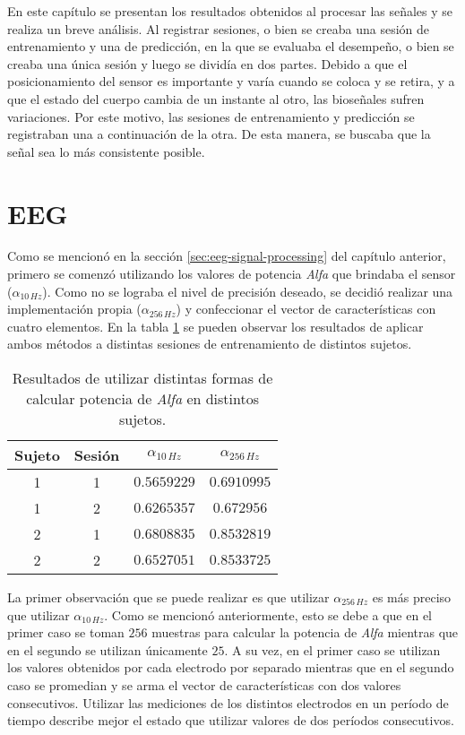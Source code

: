 En este capítulo se presentan los resultados obtenidos al procesar las señales y se realiza un breve análisis. Al registrar sesiones, o bien se creaba una sesión de entrenamiento y una de predicción, en la que se evaluaba el desempeño, o bien se creaba una única sesión y luego se dividía en dos partes. Debido a que el posicionamiento del sensor es importante y varía cuando se coloca y se retira,  y a que el estado del cuerpo cambia de un instante al otro, las bioseñales sufren variaciones. Por este motivo, las sesiones de entrenamiento y predicción se registraban una a continuación de la otra. De esta manera, se buscaba que la señal sea lo más consistente posible.

\section{EEG}

Como se mencionó en la sección \ref{sec:eeg-signal-processing} del capítulo anterior, primero se comenzó utilizando los valores de potencia \emph{Alfa} que brindaba el sensor ($\alpha_{10 \, Hz}$). Como no se lograba el nivel de precisión deseado, se decidió realizar una implementación propia ($\alpha_{256 \, Hz}$) y confeccionar el vector de características con cuatro elementos. En la tabla \ref{tab:eeg-results} se pueden observar los resultados de aplicar ambos métodos a distintas sesiones de entrenamiento de distintos sujetos.

\begin{table}[H]
\centering
\begin{tabular}{ |c|c|c|c| } 
 \hline
 Sujeto & Sesión & $\alpha_{10 \, Hz}$ &  $\alpha_{256 \, Hz}$ \\ 
 \hline
 1 & 1 & $0.5659229$ & $0.6910995$ \\
 \hline
 1 & 2 & $0.6265357$ & $0.672956$ \\
  \hline
 2 & 1 & $0.6808835$ & $0.8532819$ \\
  \hline
 2 & 2 & $0.6527051$ & $0.8533725$ \\

 \hline
\end{tabular}
\caption{Resultados de utilizar distintas formas de calcular potencia de \emph{Alfa} en distintos sujetos.}
\label{tab:eeg-results}
\end{table}

La primer observación que se puede realizar es que utilizar $\alpha_{256 \, Hz}$ es más preciso que utilizar $\alpha_{10 \, Hz}$. Como se mencionó anteriormente, esto se debe a que en el primer caso se toman $256$ muestras para calcular la potencia de \emph{Alfa} mientras que en el segundo se utilizan únicamente $25$. A su vez, en el primer caso se utilizan los valores obtenidos por cada electrodo por separado mientras que en el segundo caso se promedian y se arma el vector de características con dos valores consecutivos. Utilizar las mediciones de los distintos electrodos en un período de tiempo describe mejor el estado que utilizar valores de dos períodos consecutivos.


